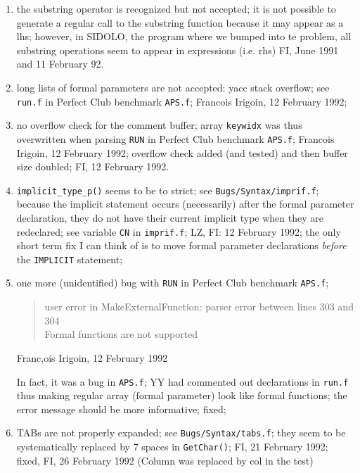 \begin{enumerate}
  \item the substring operator is recognized but not accepted; it is not
	possible to generate a regular call to the substring function
	because it may appear as a lhs; however, in SIDOLO, the program
	where we bumped into te problem, all substring operations seem
	to appear in expressions (i.e. rhs)
	FI, June 1991 and 11 February 92.

  \item long lists of formal parameters are not accepted: yacc stack overflow;
	see \verb+run.f+ in Perfect Club benchmark \verb+APS.f+;
	Francois Irigoin, 12 February 1992; 

  \item no overflow check for the comment buffer; array \verb+keywidx+ was thus
	overwritten when parsing \verb+RUN+ in 
	Perfect Club benchmark \verb+APS.f+; Francois Irigoin, 12
	February 1992; overflow check added (and tested) and then
	buffer size doubled; FI, 12 February 1992.

  \item \verb+implicit_type_p()+ seems to be to strict; 
	see \verb+Bugs/Syntax/imprif.f+; because the implicit statement
	occurs (necessarily) after the formal parameter declaration, they
	do not have their current implicit type when they are redeclared;
	see variable \verb+CN+ in \verb+imprif.f+; LZ, FI: 12 February 1992;
	the only short term fix I can think of is to move formal parameter
	declarations {\em before} the \verb+IMPLICIT+ statement;

  \item one more (unidentified) bug with \verb+RUN+ in 
	Perfect Club benchmark \verb+APS.f+; 
	\begin{quote}
	user error in MakeExternalFunction: parser error between lines 303
	and 304 \\
	Formal functions are not supported
	\end{quote}
	Franc,ois Irigoin, 12 February 1992

	In fact, it was a bug in \verb+APS.f+; 
	YY had commented out declarations in \verb+run.f+ thus making regular
	array (formal parameter) look like formal functions; the error
	message should be more informative; fixed;

  \item TABs are not properly expanded; see \verb+Bugs/Syntax/tabs.f+;
	they seem to be systematically replaced by 7 spaces 
	in \verb+GetChar()+; FI, 21 February 1992; fixed, FI, 26
	February 1992 (Column was replaced by col in the test)


\end{enumerate}
